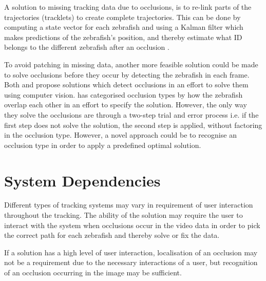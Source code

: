 A solution to missing tracking data due to occlusions, is to re-link parts of the trajectories (tracklets) to create complete trajectories. This can be done by computing a state vector for each zebrafish and using a Kalman filter which makes predictions of the zebrafish’s position, and thereby estimate what ID belongs to the different zebrafish after an occlusion \citep{Feijo2018, Qian2014}.

To avoid patching in missing data, another more feasible solution could be made to solve occlusions before they occur by detecting the zebrafish in each frame. Both \cite{Romero-Ferrero2019} and \cite{Dolado2014} propose solutions which detect occlusions in an effort to solve them using computer vision. \cite{Dolado2014} has categorised occlusion types by how the zebrafish overlap each other in an effort to specify the solution. However, the only way they solve the occlusions are through a two-step trial and error process i.e. if the first step does not solve the solution, the second step is applied, without factoring in the occlusion type. 
However, a novel approach could be to recognise an occlusion type in order to apply a predefined optimal solution.


\section{System Dependencies}\label{sec:int_dep}
Different types of tracking systems may vary in requirement of user interaction throughout the tracking. The ability of the solution may require the user to interact with the system when occlusions occur in the video data in order to pick the correct path for each zebrafish and thereby solve or fix the data. 

If a solution has a high level of user interaction, localisation of an occlusion may not be a requirement due to the necessary interactions of a user, but recognition of an occlusion occurring in the image may be sufficient.\\

